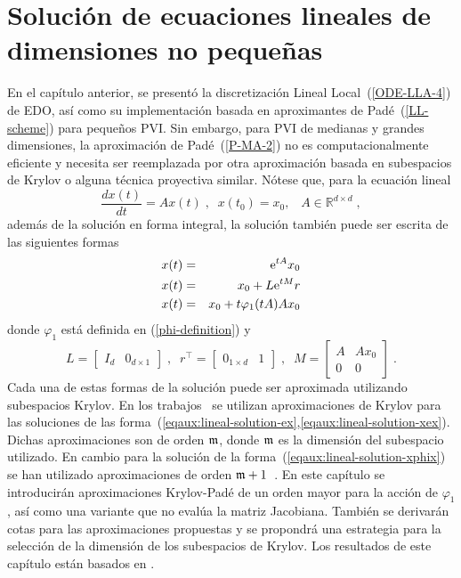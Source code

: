 \chapter{Solución de ecuaciones lineales de dimensiones no pequeñas}\label{chapter:solve-non-smal-lineal-eq}

En el capítulo anterior, se presentó la discretización Lineal Local~(\ref{ODE-LLA-4}) de EDO, así como su implementación basada en aproximantes de Padé~(\ref{LL-scheme}) para pequeños PVI. Sin embargo, para PVI de medianas y grandes dimensiones, la aproximación de Padé~(\ref{P-MA-2}) no es computacionalmente eficiente y necesita ser reemplazada por otra aproximación basada en subespacios de Krylov o alguna técnica proyectiva similar. Nótese que, para la ecuación lineal
\begin{equation*}
	\frac{dx(t)}{dt}=Ax(t)\;,\;\; x(t_0)=x_0,\;\;\; A\in\mathbb{R}^{d\times d}\;,
\end{equation*}
además de la solución en forma integral, la solución también puede ser escrita de las siguientes formas
\begin{eqnarray}
	x(t) & = & \mathrm{e}^{tA}x_0 \label{eqaux:lineal-solution-ex} \\
	x(t) & = & x_0 + L\mathrm{e}^{tM}r \label{eqaux:lineal-solution-xex} \\
	x(t) & = & x_0 + t\varphi_1(tA)Ax_0 \label{eqaux:lineal-solution-xphix}
\end{eqnarray}
donde $\varphi_1$ está definida en (\ref{phi-definition}) y
\begin{equation*}
	L=\left[ \begin{array}{ll} I_{d} & 0_{d\times 1}\end{array} \right] \;,\;\;
	r^{\intercal }=\left[ \begin{array}{ll} 0_{1\times d} & 1\end{array}\right] \;,\;\;
	M=\left[
	\begin{array}{cc}
	A & Ax_0 \\
	0 & 0
	\end{array}
	\right]\;.
\end{equation*}
Cada una de estas formas de la solución puede ser aproximada utilizando subespacios Krylov. En los trabajos~\cite{Saad92,jimenez2012convergence} se utilizan aproximaciones de Krylov para las soluciones de las forma~(\ref{eqaux:lineal-solution-ex},\ref{eqaux:lineal-solution-xex}). Dichas aproximaciones son de orden $\mathfrak{m}$, donde $\mathfrak{m}$ es la dimensión del subespacio utilizado. En cambio para la solución de la forma~(\ref{eqaux:lineal-solution-xphix}) se han utilizado aproximaciones de orden  $\mathfrak{m}+1$~\cite{sidje1998expokit,niesen2012algorithm}. En este capítulo se introducirán aproximaciones Krylov-Padé de un orden mayor para la acción de $\varphi_1$, así como una variante que no evalúa la matriz Jacobiana. También se derivarán cotas para las aproximaciones propuestas y se propondrá una estrategia para la selección de la dimensión de los subespacios de Krylov. Los resultados de este capítulo están basados en \cite{naranjo2023computing,naranjo2023RT,naranjo2021locally,naranjo2023jacobian}.

